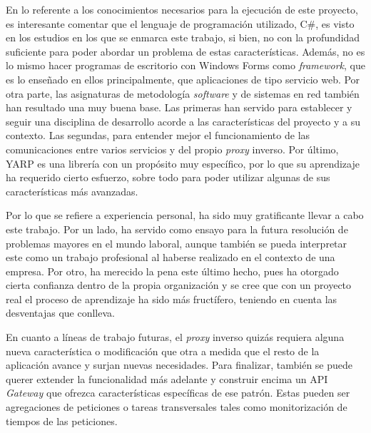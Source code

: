 \documentclass[11pt,spanish,listoffigures]{tfgetsinf}
\begin{document}
En lo referente a los conocimientos necesarios para la ejecución de este proyecto, es interesante comentar que el lenguaje de programación utilizado, C\#, es visto en los estudios en los que se enmarca este trabajo, si bien, no con la profundidad suficiente para poder abordar un problema de estas características. Además, no es lo mismo hacer programas de escritorio con Windows Forms \cite{WinForms} como \emph{framework}, que es lo enseñado en ellos principalmente, que aplicaciones de tipo servicio web. Por otra parte, las asignaturas de metodología \emph{software} y de sistemas en red también han resultado una muy buena base. Las primeras han servido para establecer y seguir una disciplina de desarrollo acorde a las características del proyecto y a su contexto. Las segundas, para entender mejor el funcionamiento de las comunicaciones entre varios servicios y del propio \emph{proxy} inverso. Por último, YARP es una librería con un propósito muy específico, por lo que su aprendizaje ha requerido cierto esfuerzo, sobre todo para poder utilizar algunas de sus características más avanzadas.

Por lo que se refiere a experiencia personal, ha sido muy gratificante llevar a cabo este trabajo. Por un lado, ha servido como ensayo para la futura resolución de problemas mayores en el mundo laboral, aunque también se pueda interpretar este como un trabajo profesional al haberse realizado en el contexto de una empresa. Por otro, ha merecido la pena este último hecho, pues ha otorgado cierta confianza dentro de la propia organización y se cree que con un proyecto real el proceso de aprendizaje ha sido más fructífero, teniendo en cuenta las desventajas que conlleva.

En cuanto a líneas de trabajo futuras, el \emph{proxy} inverso quizás requiera alguna nueva característica o modificación que otra a medida que el resto de la aplicación avance y surjan nuevas necesidades. Para finalizar, también se puede querer extender la funcionalidad más adelante y construir encima un API \emph{Gateway} que ofrezca características específicas de ese patrón. Estas pueden ser agregaciones de peticiones o tareas transversales tales como monitorización de tiempos de las peticiones.

\end{document}
